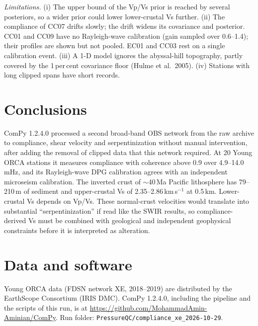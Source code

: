 \documentclass[10pt,a4paper,twocolumn]{article}
\begin{document}
\textit{Limitations.} (i) The upper bound of the Vp/Vs prior is reached by several posteriors, so a wider prior could lower
lower-crustal Vs further. (ii) The compliance of CC07 drifts slowly; the drift widens its covariance and posterior. CC01 and CC09 have no
Rayleigh-wave calibration (gain sampled over 0.6--1.4); their profiles are shown but not pooled. EC01 and CC03 rest on a single
calibration event. (iii) A 1-D model ignores the abyssal-hill topography, partly covered by the
1\,per\,cent covariance floor (Hulme et al.\ 2005). (iv) Stations with long clipped spans have short records.

\section{Conclusions}
ComPy 1.2.4.0 processed a second broad-band OBS network from the raw archive to compliance, shear velocity and
serpentinization without manual intervention, after adding the removal of clipped data that this network required. At
20 Young ORCA stations it measures compliance with coherence above 0.9 over 4.9--14.0\,mHz, and its
Rayleigh-wave DPG calibration agrees with an independent microseism calibration. The inverted crust of $\sim$40\,Ma Pacific
lithosphere has 79--210\,m of sediment and upper-crustal Vs of 2.35--2.86\,km\,s$^{-1}$ at 0.5\,km. Lower-crustal Vs depends
on Vp/Vs. These normal-crust velocities would translate into substantial ``serpentinization'' if read like the SWIR results, so
compliance-derived Vs must be combined with geological and independent geophysical constraints before it is interpreted as alteration.

\section*{Data and software}
Young ORCA data (FDSN network XE, 2018--2019) are distributed by the EarthScope Consortium (IRIS DMC). ComPy
1.2.4.0, including the pipeline and the scripts of this run, is at \url{https://github.com/MohammadAmin-Aminian/ComPy}.
Run folder: \texttt{PressureQC/compliance\_xe\_2026-10-29}.

\footnotesize
\end{document}
